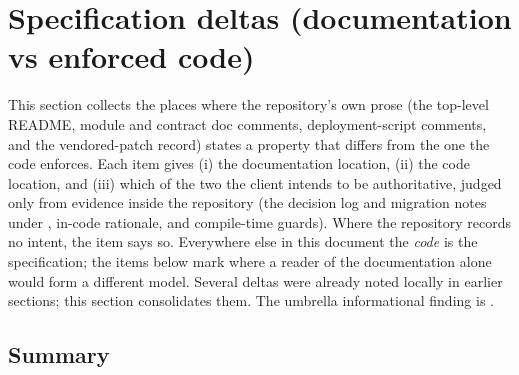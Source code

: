 \section{Specification deltas (documentation vs enforced code)}
\label{sec:deltas}

This section collects the places where the repository's own prose (the
top-level README, module and contract doc comments, deployment-script
comments, and the vendored-patch record) states a property that differs from
the one the code enforces. Each item gives (i) the documentation location,
(ii) the code location, and (iii) which of the two the client intends to be
authoritative, judged only from evidence inside the repository (the decision
log and migration notes under , in-code
rationale, and compile-time guards). Where the repository records no intent,
the item says so. Everywhere else in this document the \emph{code} is the
specification; the items below mark where a reader of the documentation alone
would form a different model. Several deltas were already noted locally in
earlier sections; this section consolidates them. The umbrella informational
finding is .

\subsection{Summary}
\label{subsec:deltas-summary}

